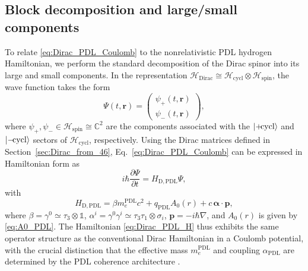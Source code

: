 \documentclass[11pt,a4paper]{article}
\theoremstyle{definition}
\newcommand{\PDL}{\mathrm{PDL}}
\newcommand{\Hspin}{\mathcal{H}_{\mathrm{spin}}}
\newcommand{\Hcycl}{\mathcal{H}_{\mathrm{cycl}}}
\newcommand{\HDirac}{\mathcal{H}_{\mathrm{Dirac}}}
\newcommand{\alphaPDL}{\alpha_{\mathrm{PDL}}}
\begin{document}
\subsection{Block decomposition and large/small components}

To relate \eqref{eq:Dirac_PDL_Coulomb} to the nonrelativistic PDL hydrogen Hamiltonian, we perform the standard decomposition of the Dirac spinor into its large and small components. In the representation $\HDirac \cong \Hcycl \otimes \Hspin$, the wave function takes the form
\[
\Psi(t,\mathbf{r}) = \begin{pmatrix}\psi_{+}(t,\mathbf{r}) \\[2pt] \psi_{-}(t,\mathbf{r})\end{pmatrix},
\]
where $\psi_{+},\psi_{-}\in \Hspin \cong \mathbb{C}^2$ are the components associated with the $\ket{+\!\text{cycl}}$ and $\ket{-\!\text{cycl}}$ sectors of $\Hcycl$, respectively. Using the Dirac matrices defined in Section~\ref{sec:Dirac_from_46}, Eq.~\eqref{eq:Dirac_PDL_Coulomb} can be expressed in Hamiltonian form as
\begin{equation}
i\hbar \frac{\partial \Psi}{\partial t} = H_{\mathrm{D,PDL}}\Psi,
\label{eq:Dirac_PDL_Hamiltonian}
\end{equation}
with
\begin{equation}
H_{\mathrm{D,PDL}} = \beta m_e^{\PDL} c^2 + q_{\PDL} A_0(r) + c\,\boldsymbol{\alpha}\cdot\mathbf{p},
\label{eq:Dirac_PDL_H}
\end{equation}
where $\beta = \gamma^0 \simeq \tau_3 \otimes \mathbb{1}$, $\alpha^i = \gamma^0 \gamma^i \simeq \tau_3\tau_1 \otimes \sigma_i$, $\mathbf{p} = -i\hbar\nabla$, and $A_0(r)$ is given by \eqref{eq:A0_PDL}. The Hamiltonian \eqref{eq:Dirac_PDL_H} thus exhibits the same operator structure as the conventional Dirac Hamiltonian in a Coulomb potential, with the crucial distinction that the effective mass $m_e^{\PDL}$ and coupling $\alphaPDL$ are determined by the PDL coherence architecture \cite{PDL,Schodinger_PDL}.
\end{document}
